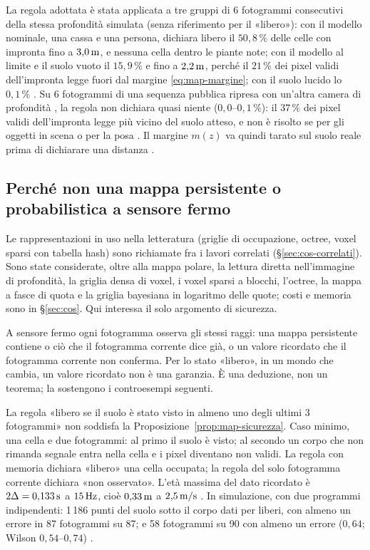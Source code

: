 La regola adottata è stata applicata a tre gruppi di 6 fotogrammi consecutivi della stessa profondità simulata (senza riferimento per il «libero»): con il modello nominale, una cassa e una persona, dichiara libero il $50{,}8\,\%$ delle celle con impronta fino a $3{,}0\,\mathrm{m}$, e nessuna cella dentro le piante note; con il modello al limite e il suolo vuoto il $15{,}9\,\%$ e fino a $2{,}2\,\mathrm{m}$, perché il $21\,\%$ dei pixel validi dell'impronta legge fuori dal margine \eqref{eq:map-margine}; con il suolo lucido lo $0{,}1\,\%$ . Su 6 fotogrammi di una sequenza pubblica ripresa con un'altra camera di profondità \cite{tum-rgbd}, la regola non dichiara quasi niente ($0{,}0$–$0{,}1\,\%$): il $37\,\%$ dei pixel validi dell'impronta legge più vicino del suolo atteso, e non è risolto se per gli oggetti in scena o per la posa . Il margine $m(z)$ va quindi tarato sul suolo reale prima di dichiarare una distanza .

\subsection{Perché non una mappa persistente o probabilistica a sensore fermo}\label{sec:map-persistente}

Le rappresentazioni in uso nella letteratura (griglie di occupazione, octree, voxel sparsi con tabella hash) sono richiamate fra i lavori correlati (\S\ref{sec:cos-correlati}). Sono state considerate, oltre alla mappa polare, la lettura diretta nell'immagine di profondità, la griglia densa di voxel, i voxel sparsi a blocchi, l'octree, la mappa a fasce di quota e la griglia bayesiana in logaritmo delle quote; costi e memoria sono in \S\ref{sec:cos}. Qui interessa il solo argomento di sicurezza.

\begin{osservazione}\label{oss:map-fermo}
A sensore fermo ogni fotogramma osserva gli stessi raggi: una mappa persistente contiene o ciò che il fotogramma corrente dice già, o un valore ricordato che il fotogramma corrente non conferma. Per lo stato «libero», in un mondo che cambia, un valore ricordato non è una garanzia. È una deduzione, non un teorema; la sostengono i controesempi seguenti.
\end{osservazione}

\begin{controesempio}\label{cex:map-memoria}
La regola «libero se il suolo è stato visto in almeno uno degli ultimi 3 fotogrammi» non soddisfa la Proposizione~\ref{prop:map-sicurezza}. Caso minimo, una cella e due fotogrammi: al primo il suolo è visto; al secondo un corpo che non rimanda segnale entra nella cella e i pixel diventano non validi. La regola con memoria dichiara «libero» una cella occupata; la regola del solo fotogramma corrente dichiara «non osservato». L'età massima del dato ricordato è $2\Delta=0{,}133\,\mathrm{s}$ a $15\,\mathrm{Hz}$, cioè $0{,}33\,\mathrm{m}$ a $2{,}5\,\mathrm{m/s}$ . In simulazione, con due programmi indipendenti: 1\,186 punti del suolo sotto il corpo dati per liberi, con almeno un errore in 87 fotogrammi su 87; e 58 fotogrammi su 90 con almeno un errore ($0{,}64$; Wilson $0{,}54$–$0{,}74$) .
\end{controesempio}


